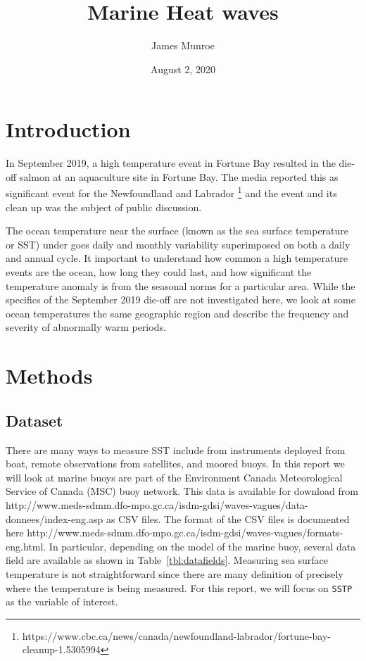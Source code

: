 \documentclass[12pt, letterpaper]{article}
\title{Marine Heat waves}
\author{James Munroe}
\date{August 2, 2020}
\begin{document}
\maketitle

\section{Introduction}

In September 2019, a high temperature event in Fortune Bay resulted in the die-off salmon at an aquaculture site in Fortune Bay. The media reported this as significant event for the Newfoundland and Labrador \footnote{https://www.cbc.ca/news/canada/newfoundland-labrador/fortune-bay-cleanup-1.5305994} and the event and its clean up was the subject of public discussion. 
 
The ocean temperature near the surface (known as the sea surface temperature or SST) under goes daily and monthly variability superimposed on both a daily and annual cycle.  It important to understand how common a high temperature events are the ocean, how long they could last, and how significant the temperature anomaly is from the seasonal norms for a particular area.  While the specifics of the September 2019 die-off are not investigated here, we look at some ocean temperatures the same geographic region and describe the frequency and severity of abnormally warm periods.

\section{Methods}

\subsection{Dataset}

There are many ways to measure SST include from instruments deployed from boat, remote observations from satellites, and moored buoys.  In this report we will look at marine buoys are part of the Environment Canada Meteorological Service of Canada (MSC) buoy network.  This data is available for download from http://www.meds-sdmm.dfo-mpo.gc.ca/isdm-gdsi/waves-vagues/data-donnees/index-eng.asp as CSV files. The format of the CSV files is documented here http://www.meds-sdmm.dfo-mpo.gc.ca/isdm-gdsi/waves-vagues/formats-eng.html. In particular, depending on the model of the marine buoy, several data field are available as shown in Table~\ref{tbl:datafields}. Measuring sea surface temperature is not straightforward since there are many definition of precisely where the temperature is being measured.  For this report, we will focus on \texttt{SSTP} as the variable of interest.
\end{document}

